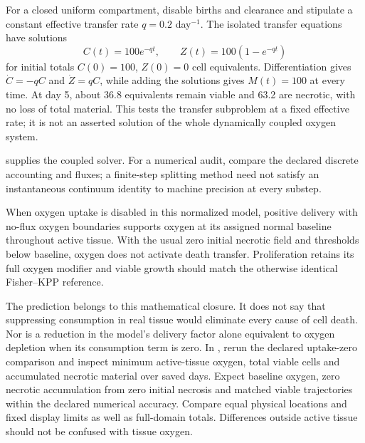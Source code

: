 For a closed uniform compartment, disable births and clearance and stipulate a constant effective transfer rate $q=0.2$ day$^{-1}$. The isolated transfer equations have solutions
\[
C(t)=100e^{-qt},\qquad Z(t)=100(1-e^{-qt})
\]
for initial totals $C(0)=100$, $Z(0)=0$ cell equivalents. Differentiation gives $\dot C=-qC$ and $\dot Z=qC$, while adding the solutions gives $M(t)=100$ at every time. At day 5, about 36.8 equivalents remain viable and 63.2 are necrotic, with no loss of total material. This tests the transfer subproblem at a fixed effective rate; it is not an asserted solution of the whole dynamically coupled oxygen system.

 supplies the coupled solver. For a numerical audit, compare the declared discrete accounting and fluxes; a finite-step splitting method need not satisfy an instantaneous continuum identity to machine precision at every substep.

\biomedicalanswer
{}
When oxygen uptake is disabled in this normalized model, positive delivery with no-flux oxygen boundaries supports oxygen at its assigned normal baseline throughout active tissue. With the usual zero initial necrotic field and thresholds below baseline, oxygen does not activate death transfer. Proliferation retains its full oxygen modifier and viable growth should match the otherwise identical Fisher--KPP reference.

The prediction belongs to this mathematical closure. It does not say that suppressing consumption in real tissue would eliminate every cause of cell death. Nor is a reduction in the model's delivery factor alone equivalent to oxygen depletion when its consumption term is zero.
In , rerun the declared uptake-zero comparison and inspect minimum active-tissue oxygen, total viable cells and accumulated necrotic material over saved days. Expect baseline oxygen, zero necrotic accumulation from zero initial necrosis and matched viable trajectories within the declared numerical accuracy. Compare equal physical locations and fixed display limits as well as full-domain totals. Differences outside active tissue should not be confused with tissue oxygen.

